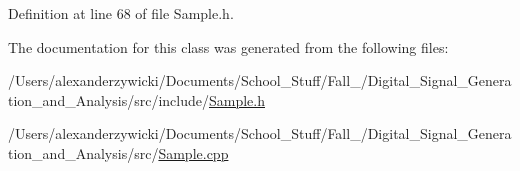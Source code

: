 Definition at line 68 of file Sample.\+h.



The documentation for this class was generated from the following files\+:\begin{DoxyCompactItemize}
\item 
/\+Users/alexanderzywicki/\+Documents/\+School\+\_\+\+Stuff/\+Fall\+\_/\+Digital\+\_\+\+Signal\+\_\+\+Generation\+\_\+and\+\_\+\+Analysis/src/include/\hyperlink{_sample_8h}{Sample.\+h}\item 
/\+Users/alexanderzywicki/\+Documents/\+School\+\_\+\+Stuff/\+Fall\+\_/\+Digital\+\_\+\+Signal\+\_\+\+Generation\+\_\+and\+\_\+\+Analysis/src/\hyperlink{_sample_8cpp}{Sample.\+cpp}\end{DoxyCompactItemize}

